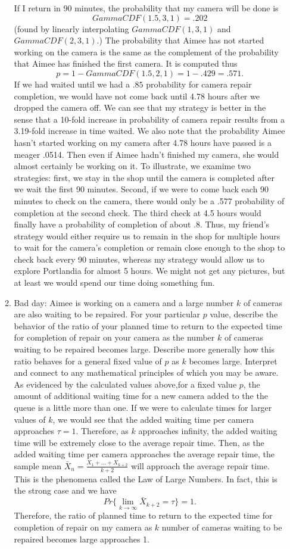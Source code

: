 \documentclass[12pt]{article}
\numberwithin{equation}{section}
\begin{document}
\begin{enumerate}
\begin{enumerate}
 If I return in 90 minutes, the probability that my camera will be done is $$GammaCDF(1.5,3,1)=.202$$ (found by linearly interpolating $GammaCDF(1,3,1)$ and $GammaCDF(2,3,1)$.) The probability that Aimee has not started working on the camera is the same as the complement of the probability that Aimee has finished the first camera. It is computed thus
$$p=1-GammaCDF(1.5,2,1)=1-.429=.571.$$
If we had waited until we had a $.85$ probability for camera repair completion, we would have not come back until 4.78 hours after we dropped the camera off. We can see that my strategy is better in the sense that a 10-fold increase in probability of camera repair results from a 3.19-fold increase in time waited. We also note that the probability Aimee hasn't started working on my camera after 4.78 hours have passed is a meager .0514. Then even if Aimee hadn't finished my camera, she would almost certainly be working on it. To illustrate, we examime two strategies: first, we stay in the shop until the camera is completed after we wait the first 90 minutes. Second, if we were to come back each 90 minutes to check on the camera, there would only be a .577 probability of completion at the second check. The third check at 4.5 hours would finally have a probability of completion of about .8. Thus, my friend's strategy would either require us to remain in the shop for multiple hours to wait for the camera's completion or remain close enough to the shop to check back every 90 minutes, whereas my strategy would allow us to explore Portlandia for almost 5 hours. We might not get any pictures, but at least we would spend our time doing something fun.

\item Bad day: Aimee is working on a camera and a large number $k$ of cameras are also waiting to be repaired. For your particular $p$ value, describe the behavior of the ratio of your planned time to return to the expected time for completion of repair on your camera as the number $k$ of cameras waiting to be repaired becomes large. Describe more generally how this ratio behaves for a general fixed value of $p$ as $k$ becomes large. Interpret and connect to any mathematical principles of which you may be aware. \\

As evidenced by the calculated values above,for a fixed value $p$, the amount of additional waiting time for a new camera added to the the queue is a little more than one. If we were to calculate times for larger values of $k$, we would see that the added waiting time per camera approaches $\tau=1$. Therefore, as $k$ approaches infinity, the added waiting time will be extremely close to the average repair time. Then, as the added waiting time per camera approaches the average repair time, the sample mean $\bar{X}_n=\frac{X_1+...+X_{k+2}}{k+2}$ will approach the average repair time. This is the phenomena called the Law of Large Numbers. In fact, this is the strong case and we have 
$$Pr\{\lim_{k\to\infty}\bar{X}_{k+2}=\tau\}=1.$$
Therefore, the ratio of planned time to return to the expected time for completion of repair on my camera as $k$ number of cameras waiting to be repaired becomes large approaches 1.



\end{enumerate}
\end{enumerate}
\end{document}

